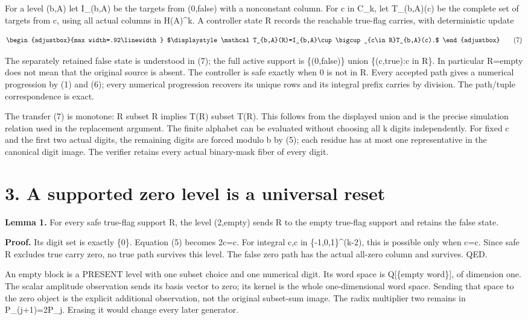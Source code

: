 For a level (b,A) let I\_(b,A) be the targets from (0,false) with a nonconstant column. For c in C\_k, let T\_(b,A)(c) be the complete set of targets from c, using all actual columns in H(A)\^{}k. A controller state R records the reachable true-flag carries, with deterministic update

\[
\begin{adjustbox}{max width=.92\linewidth}
$\displaystyle \mathcal T_{b,A}(R)=I_{b,A}\cup\bigcup_{c\in R}T_{b,A}(c).$
\end{adjustbox}
\tag{7}
\]

The separately retained false state is understood in (7); the full active support is \{(0,false)\} union \{(c,true):c in R\}. In particular R=empty does not mean that the original source is absent. The controller is safe exactly when 0 is not in R. Every accepted path gives a numerical progression by (1) and (6); every numerical progression recovers its unique rows and its integral prefix carries by division. The path/tuple correspondence is exact.

The transfer (7) is monotone: R subset R\textquotesingle{} implies T(R) subset T(R\textquotesingle). This follows from the displayed union and is the precise simulation relation used in the replacement argument. The finite alphabet can be evaluated without choosing all k digits independently. For fixed c and the first two actual digits, the remaining digits are forced modulo b by (5); each residue has at most one representative in the canonical digit image. The verifier retains every actual binary-mask fiber of every digit.

\section{3. A supported zero level is a universal reset}\label{n07-a-supported-zero-level-is-a-universal-reset}

\textbf{Lemma 1.} For every safe true-flag support R, the level (2,empty) sends R to the empty true-flag support and retains the false state.

\textbf{Proof.} Its digit set is exactly \{0\}. Equation (5) becomes 2c\textquotesingle=c. For integral c,c\textquotesingle{} in \{-1,0,1\}\^{}(k-2), this is possible only when c=c. Since safe R excludes true carry zero, no true path survives this level. The false zero path has the actual all-zero column and survives. QED.

An empty block is a PRESENT level with one subset choice and one numerical digit. Its word space is Q{[}\{empty word\}{]}, of dimension one. The scalar amplitude observation sends its basis vector to zero; its kernel is the whole one-dimensional word space. Sending that space to the zero object is the explicit additional observation, not the original subset-sum image. The radix multiplier two remains in P\_(j+1)=2P\_j. Erasing it would change every later generator.


